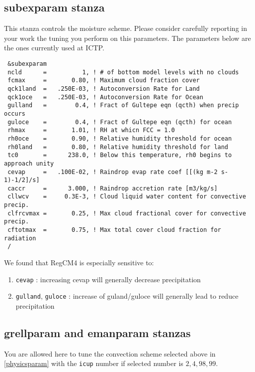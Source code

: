 \subsection{subexparam stanza}

This stanza controls the moisture scheme. Please consider carefully reporting
in your work the tuning you perform on this parameters. The parameters below
are the ones currently used at ICTP.

{\footnotesize
\begin{Verbatim}
 &subexparam
 ncld      =          1, ! # of bottom model levels with no clouds
 fcmax     =       0.80, ! Maximum cloud fraction cover
 qck1land  =   .250E-03, ! Autoconversion Rate for Land
 qck1oce   =   .250E-03, ! Autoconversion Rate for Ocean
 gulland   =        0.4, ! Fract of Gultepe eqn (qcth) when precip occurs
 guloce    =        0.4, ! Fract of Gultepe eqn (qcth) for ocean
 rhmax     =       1.01, ! RH at whicn FCC = 1.0
 rh0oce    =       0.90, ! Relative humidity threshold for ocean
 rh0land   =       0.80, ! Relative humidity threshold for land
 tc0       =      238.0, ! Below this temperature, rh0 begins to approach unity
 cevap     =   .100E-02, ! Raindrop evap rate coef [[(kg m-2 s-1)-1/2]/s]
 caccr     =      3.000, ! Raindrop accretion rate [m3/kg/s]
 cllwcv    =     0.3E-3, ! Cloud liquid water content for convective precip.
 clfrcvmax =       0.25, ! Max cloud fractional cover for convective precip.
 cftotmax  =       0.75, ! Max total cover cloud fraction for radiation
 /
\end{Verbatim}
}

We found that RegCM4 is especially sensitive to:

\begin{enumerate}
\item \verb=cevap= : increasing cevap will generally decrease precipitation
\item \verb=gulland=, \verb=guloce= : increase of guland/guloce will generally
lead to reduce precipitation
\end{enumerate}

\subsection{grellparam and emanparam stanzas}

You are allowed here to tune the convection scheme selected above in
\ref{physicsparam} with the \verb=icup= number if selected number is
$2, 4, 98, 99$. 

